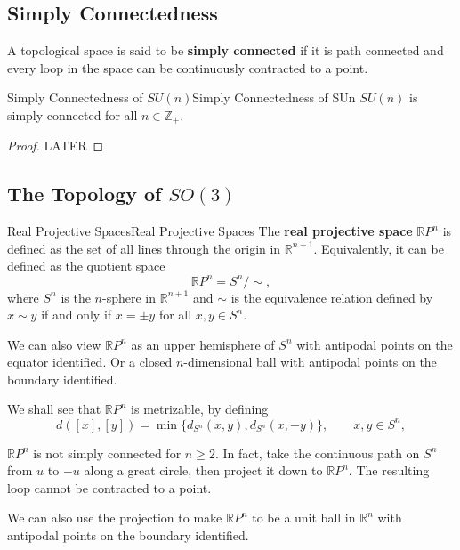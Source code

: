 \documentclass[../main.tex]{subfiles}
\begin{document}
\subsection{Simply Connectedness}
A topological space is said to be \textbf{simply connected} if it is path connected and every loop in the space can be continuously contracted to a point.

\begin{proposition}{Simply Connectedness of $SU(n)$}{Simply Connectedness of SUn}
	$SU(n)$ is simply connected for all $n \in \mathbb{Z}_+$.
\end{proposition}
\begin{proof}
	LATER
\end{proof}

\subsection{The Topology of $SO(3)$}

\begin{definition}{Real Projective Spaces}{Real Projective Spaces}
	The \textbf{real projective space} $\mathbb{R}P^n$ is defined as the set of all lines through the origin in $\mathbb{R}^{n+1}$. Equivalently, it can be defined as the quotient space
	\begin{equation*}
		\mathbb{R}P^n = S^n / \sim,
	\end{equation*}
	where $S^n$ is the $n$-sphere in $\mathbb{R}^{n+1}$ and $\sim$ is the equivalence relation defined by $x \sim y$ if and only if $x = \pm y$ for all $x,y \in S^n$.
\end{definition}
We can also view $\mathbb{R}P^n$ as an upper hemisphere of $S^n$ with antipodal points on the equator identified. Or a closed $n$-dimensional ball with antipodal points on the boundary identified.

We shall see that $\mathbb{R}P^n$ is metrizable, by defining
\begin{equation*}
	d([x],[y]) = \min \{ d_{S^n}(x,y), d_{S^n}(x,-y) \}, \qquad x,y \in S^n,
\end{equation*}

$\mathbb{R}P^n$ is not simply connected for $n \geq 2$. In fact, take the continuous path on $S^n$ from $u$ to $-u$ along a great circle, then project it down to $\mathbb{R}P^n$. The resulting loop cannot be contracted to a point.

We can also use the projection to make $\mathbb{R}P^n$ to be a unit ball in $\mathbb{R}^n$ with antipodal points on the boundary identified.
\end{document}
